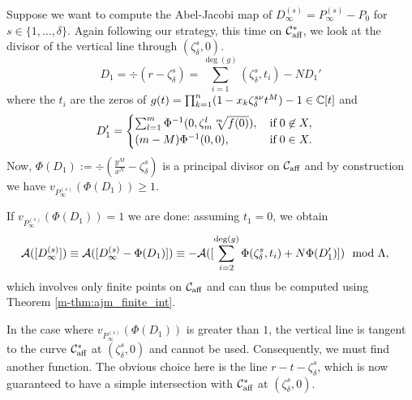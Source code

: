\documentclass[main.tex]{subfiles}
\begin{document}
   
   Suppose we want to compute the Abel-Jacobi map of $D_{\infty}^{(s)} = P_{\infty}^{(s)} - P_0$ for $s \in \{1,\dots,\delta\}$.
   Again following our strategy,
   this time on $\mathcal{C}_{\text{aff}}^{*}$, we look at the divisor of the vertical line through $(\zeta_{\delta}^s,0)$.
   \begin{equation}
      D_1 = \div(r - \zeta_{\delta}^s) = \sum_{i = 1}^{\deg(g)} (\zeta_{\delta}^s,t_i) - N D_1'
   \end{equation}
      where the $t_i$ are the zeros of $g(t) = \prod_{k=1}^n (1-x_k\zeta_{\delta}^{s\nu}t^M) - 1 \in \mathbb{C}[t]$ and
    \begin{equation}
       D_1' = \begin{cases}
             \sum_{l=1}^m \Phi^{-1}(0,\zeta_m^l \sqrt[m]{f(0)}), \quad \text{if} \; 0 \not\in X,\\
             (m-M) \Phi^{-1}(0,0), \hfill \text{if} \; 0 \in X.
            \end{cases}
    \end{equation}
    Now, $\Phi(D_1) := \div \left( \frac{y^M}{x^N} - \zeta_{\delta}^s \right)$ is a principal divisor on $\mathcal{C}_{\text{aff}}$ and by
    construction we have $v_{P_{\infty}^{(s)}}(\Phi(D_1)) \ge 1$.
    
  
    If $v_{P_{\infty}^{(s)}}(\Phi(D_1)) = 1$ we are done: assuming $t_1 = 0$, we obtain
    \begin{align}
      \mathcal{A}( [D_{\infty}^{(s)}] )  & \equiv  \mathcal{A}([D_{\infty}^{(s)} - \Phi(D_1)])  
      \equiv  -\mathcal{A}( [\sum_{i = 2}^{\operatorname{deg}(g)} \Phi(\zeta_{\delta}^s,t_i) + N \Phi(D_1') ] )
       \mod \Lambda,
    \end{align}
    which involves only finite points on $\mathcal{C}_{\text{aff}}$ and can thus be computed using Theorem \ref{m-thm:ajm_finite_int}.
    
    \bigskip
    
    In the case where $v_{P_{\infty}^{(s)}}(\Phi(D_1))$ is greater than $1$, the vertical line is tangent to the curve $\mathcal{C}_{\text{aff}}^{*}$ 
    at $(\zeta_{\delta}^s,0)$ and cannot be used.
    Consequently, we must find another function. The obvious choice here is the line $r - t -  \zeta_{\delta}^s$, which
    is now guaranteed to have a simple intersection with $\mathcal{C}_{\text{aff}}^{*}$ 
    at $(\zeta_{\delta}^s,0)$.
\end{document}
